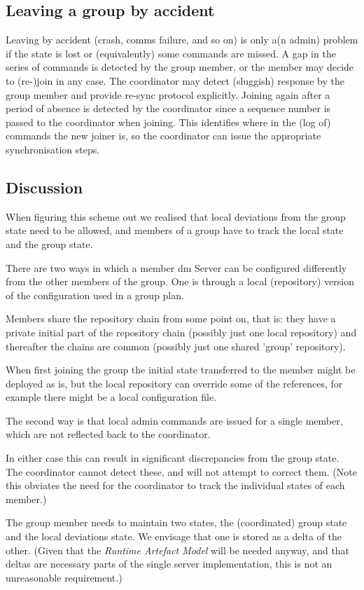 \documentclass[a4paper,12pt]{article}
\begin{document}
\subsection{Leaving a group by accident}
Leaving by accident (crash, comms failure, and so on) is only a(n admin) problem if the state is lost or (equivalently) some commands are missed. A gap in the series of commands is detected by the group member, or the member may decide to (re-)join in any case. The coordinator may detect (sluggish) response by the group member and provide re-sync protocol explicitly. Joining again after a period of absence is detected by the coordinator since a sequence number is passed to the coordinator when joining. This identifies where in the (log of) commands the new joiner is, so the coordinator can issue the appropriate synchronisation steps.

\subsection{Discussion}
When figuring this scheme out we realised that local deviations from the group state need to be allowed, and members of a group have to track the local state and the group state.

There are two ways in which a member dm Server can be configured differently from the other members of the group. One is through a local (repository) version of the configuration used in a group plan.

Members share the repository chain from some point on, that is: they have a private initial part of the repository chain (possibly just one local repository) and thereafter the chains are common (possibly just one shared 'group' repository).

When first joining the group the initial state transferred to the member might be deployed as is, but the local repository can override some of the references, for example there might be a local configuration file.

The second way is that local admin commands are issued for a single member, which are not reflected back to the coordinator.

In either case this can result in significant discrepancies from the group state. The coordinator cannot detect these, and will not attempt to correct them. (Note this obviates the need for the coordinator to track the individual states of each member.)

The group member needs to maintain two states, the (coordinated) group state and the local deviations state. We envisage that one is stored as a delta of the other. (Given that the \emph{Runtime Artefact Model} will be needed anyway, and that deltas are necessary parts of the single server implementation, this is not an unreasonable requirement.)
\end{document}
